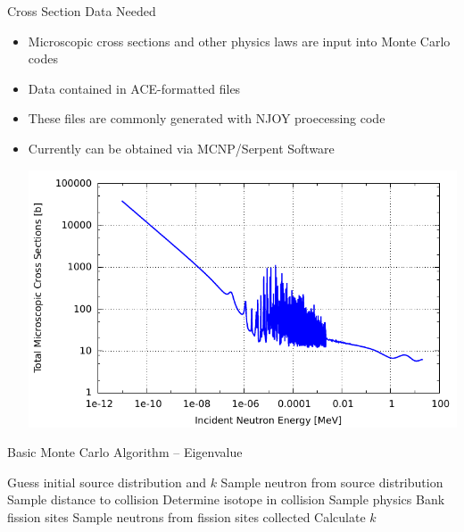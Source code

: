 \documentclass[serif]{beamer}
\begin{document}
\begin{frame}{Cross Section Data Needed}

  \begin{itemize}
    \item<1-> Microscopic cross sections and other physics laws are input into
              Monte Carlo codes\vfill
    \item<1-> Data contained in ACE-formatted files\vfill
    \item<1-> These files are commonly generated with NJOY proecessing code\vfill
    \item<1-> Currently can be obtained via MCNP/Serpent Software
    \vfill
    \begin{center}
      \includegraphics[scale=0.55]{../src/U235xs.pdf}
    \end{center}
  \end{itemize}

\end{frame}


\begin{frame}{Basic Monte Carlo Algorithm -- Eigenvalue}
    \begin{algorithmic}
      \State Guess initial source distribution and $k$
            \State Sample neutron from source distribution
              \State Sample distance to collision
              \State Determine isotope in collision
              \State Sample physics
              \State Bank fission sites
            \EndWhile
          \EndFor
          \State Sample neutrons from fission sites collected
          \State Calculate $k$
        \EndFor
    \end{algorithmic}
\end{frame}
\end{document}
